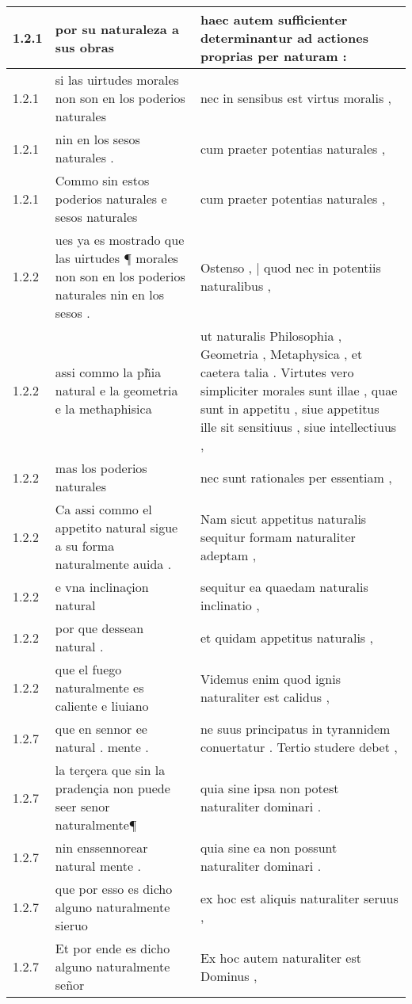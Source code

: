 \begin{tabular}{|p{1cm}|p{6.5cm}|p{6.5cm}|}
1.2.1 & por su naturaleza a sus obras & haec autem sufficienter determinantur ad actiones proprias per naturam : \\\hline
1.2.1 & si las uirtudes morales non son en los poderios naturales & nec in sensibus est virtus moralis , \\\hline
1.2.1 & nin en los sesos naturales . & cum praeter potentias naturales , \\\hline
1.2.1 & Commo sin estos poderios naturales e sesos naturales & cum praeter potentias naturales , \\\hline
1.2.2 & ues ya es mostrado que las uirtudes ¶ morales non son en los poderios naturales nin en los sesos . & Ostenso , | quod nec in potentiis naturalibus , \\\hline
1.2.2 & assi commo la ph̃ia natural e la geometria e la methaphisica & ut naturalis Philosophia , Geometria , Metaphysica , et caetera talia . Virtutes vero simpliciter morales sunt illae , quae sunt in appetitu , siue appetitus ille sit sensitiuus , siue intellectiuus , \\\hline
1.2.2 & mas los poderios naturales & nec sunt rationales per essentiam , \\\hline
1.2.2 & Ca assi commo el appetito natural sigue a su forma naturalmente auida . & Nam sicut appetitus naturalis sequitur formam naturaliter adeptam , \\\hline
1.2.2 & e vna inclinaçion natural & sequitur ea quaedam naturalis inclinatio , \\\hline
1.2.2 & por que dessean natural . & et quidam appetitus naturalis , \\\hline
1.2.2 & que el fuego naturalmente es caliente e liuiano & Videmus enim quod ignis naturaliter est calidus , \\\hline
1.2.7 & que en sennor ee natural . mente . & ne suus principatus in tyrannidem conuertatur . Tertio studere debet , \\\hline
1.2.7 & la terçera que sin la pradençia non puede seer senor naturalmente¶ & quia sine ipsa non potest naturaliter dominari . \\\hline
1.2.7 & nin enssennorear natural mente . & quia sine ea non possunt naturaliter dominari . \\\hline
1.2.7 & que por esso es dicho alguno naturalmente sieruo & ex hoc est aliquis naturaliter seruus , \\\hline
1.2.7 & Et por ende es dicho alguno naturalmente señor & Ex hoc autem naturaliter est Dominus , \\\hline

\end{tabular}
